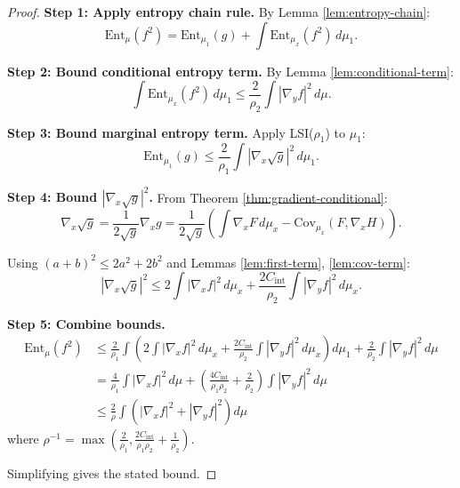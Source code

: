 \begin{proof}
\textbf{Step 1: Apply entropy chain rule.}
By Lemma \ref{lem:entropy-chain}:
\begin{equation}
    \mathrm{Ent}_\mu(f^2) = \mathrm{Ent}_{\mu_1}(g) + \int \mathrm{Ent}_{\mu_x}(f^2) \, d\mu_1.
\end{equation}

\textbf{Step 2: Bound conditional entropy term.}
By Lemma \ref{lem:conditional-term}:
\begin{equation}
    \int \mathrm{Ent}_{\mu_x}(f^2) \, d\mu_1 \leq \frac{2}{\rho_2} \int |\nabla_y f|^2 \, d\mu.
\end{equation}

\textbf{Step 3: Bound marginal entropy term.}
Apply LSI($\rho_1$) to $\mu_1$:
\begin{equation}
    \mathrm{Ent}_{\mu_1}(g) \leq \frac{2}{\rho_1} \int |\nabla_x \sqrt{g}|^2 \, d\mu_1.
\end{equation}

\textbf{Step 4: Bound $|\nabla_x \sqrt{g}|^2$.}
From Theorem \ref{thm:gradient-conditional}:
\begin{equation}
    \nabla_x \sqrt{g} = \frac{1}{2\sqrt{g}} \nabla_x g = \frac{1}{2\sqrt{g}} \left( \int \nabla_x F \, d\mu_x - \mathrm{Cov}_{\mu_x}(F, \nabla_x H) \right).
\end{equation}

Using $(a+b)^2 \leq 2a^2 + 2b^2$ and Lemmas \ref{lem:first-term}, \ref{lem:cov-term}:
\begin{equation}
    |\nabla_x \sqrt{g}|^2 \leq 2 \int |\nabla_x f|^2 \, d\mu_x + \frac{2C_{\mathrm{int}}}{\rho_2} \int |\nabla_y f|^2 \, d\mu_x.
\end{equation}

\textbf{Step 5: Combine bounds.}
\begin{align}
    \mathrm{Ent}_\mu(f^2) &\leq \frac{2}{\rho_1} \int \left( 2 \int |\nabla_x f|^2 \, d\mu_x + \frac{2C_{\mathrm{int}}}{\rho_2} \int |\nabla_y f|^2 \, d\mu_x \right) d\mu_1 + \frac{2}{\rho_2} \int |\nabla_y f|^2 \, d\mu \\
    &= \frac{4}{\rho_1} \int |\nabla_x f|^2 \, d\mu + \left( \frac{4C_{\mathrm{int}}}{\rho_1 \rho_2} + \frac{2}{\rho_2} \right) \int |\nabla_y f|^2 \, d\mu \\
    &\leq \frac{2}{\rho} \int \left( |\nabla_x f|^2 + |\nabla_y f|^2 \right) d\mu
\end{align}
where $\rho^{-1} = \max\left( \frac{2}{\rho_1}, \frac{2C_{\mathrm{int}}}{\rho_1\rho_2} + \frac{1}{\rho_2} \right)$.

Simplifying gives the stated bound.
\end{proof}

